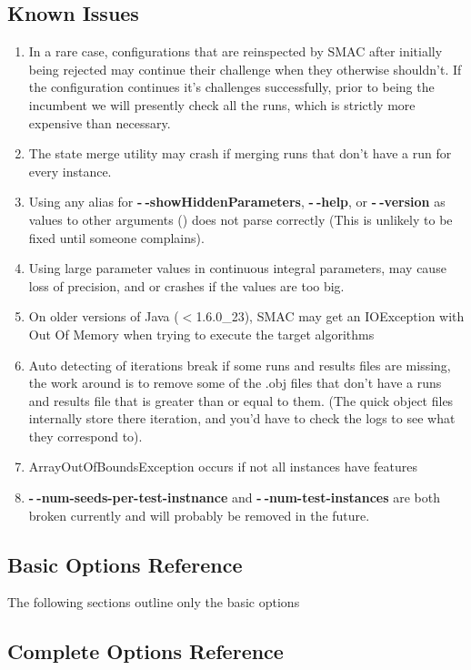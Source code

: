 \documentclass[11pt,letterpaper,oneside]{article}
\begin{document}
\subsection{Known Issues}
\label{known-issues}
\begin{enumerate}
\item In a rare case, configurations that are reinspected by SMAC after initially being rejected may continue their challenge when they otherwise shouldn't. If the configuration continues it's challenges successfully, prior to being the incumbent we will presently check all the runs, which is strictly more expensive than necessary.
\item The state merge utility may crash if merging runs that don't have a run for every instance.
\item Using any alias for \textbf{-$~\!$-showHiddenParameters}, \textbf{-$~\!$-help}, or \textbf{-$~\!$-version} as values to other arguments () does not parse correctly (This is unlikely to be fixed until someone complains).
\item Using large parameter values in continuous integral parameters, may cause loss of precision, and or crashes if the values are too big.
\item On older versions of Java ($<$1.6.0\_23), SMAC  may get an IOException with Out Of Memory when trying to execute the target algorithms
\item Auto detecting of iterations break if some runs and results files are missing, the work around is to remove some of the .obj files that don't have a runs and results file that is greater than or equal to them. (The quick object files internally store there iteration, and you'd have to check the logs to see what they correspond to).
\item ArrayOutOfBoundsException occurs if not all instances have features
\item \textbf{-$~\!$-num-seeds-per-test-instnance} and \textbf{-$~\!$-num-test-instances} are both broken currently and will probably be removed in the future.

\end{enumerate}

\clearpage


\subsection{Basic Options Reference}
The following sections outline only the basic options
\label{sec:options-basic-ref}



\clearpage

\subsection{Complete Options Reference}
\label{sec:options-ref}

\end{document}
